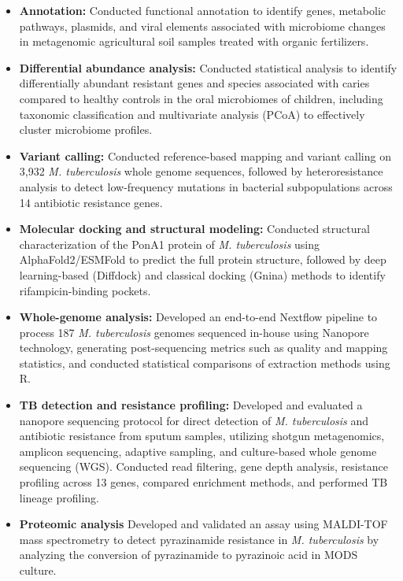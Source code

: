 \documentclass[11pt,a4paper,sans]{moderncv}
\begin{document}
  \cventry{}{}
  {}{}{}
  {\begin{itemize}%
    \item \textbf{Annotation:} Conducted functional annotation to identify genes, metabolic pathways, plasmids, and viral elements associated with microbiome changes in metagenomic agricultural soil samples treated with organic fertilizers.
    \item \textbf{Differential abundance analysis:} Conducted statistical analysis to identify differentially abundant resistant genes and species associated with caries compared to healthy controls in the oral microbiomes of children, including taxonomic classification and multivariate analysis (PCoA) to effectively cluster microbiome profiles.
    \item \textbf{Variant calling:} Conducted reference-based mapping and variant calling on 3,932 \textit{M. tuberculosis} whole genome sequences, followed by heteroresistance analysis to detect low-frequency mutations in bacterial subpopulations across 14 antibiotic resistance genes.
    \item \textbf{Molecular docking and structural modeling:} Conducted structural characterization of the PonA1 protein of \textit{M. tuberculosis} using AlphaFold2/ESMFold to predict the full protein structure, followed by deep learning-based (Diffdock) and classical docking (Gnina) methods to identify rifampicin-binding pockets.
    \item \textbf{Whole-genome analysis:} Developed an end-to-end Nextflow pipeline to process 187 \textit{M. tuberculosis} genomes sequenced in-house using Nanopore technology, generating post-sequencing metrics such as quality and mapping statistics, and conducted statistical comparisons of extraction methods using R.
    \item \textbf{TB detection and resistance profiling:} Developed and evaluated a nanopore sequencing protocol for direct detection of \textit{M. tuberculosis} and antibiotic resistance from sputum samples, utilizing shotgun metagenomics, amplicon sequencing, adaptive sampling, and culture-based whole genome sequencing (WGS). Conducted read filtering, gene depth analysis, resistance profiling across 13 genes, compared enrichment methods, and performed TB lineage profiling.
    \item \textbf{Proteomic analysis} Developed and validated an assay using MALDI-TOF mass spectrometry to detect pyrazinamide resistance in \textit{M. tuberculosis} by analyzing the conversion of pyrazinamide to pyrazinoic acid in MODS culture.

\end{itemize}}
\end{document}
